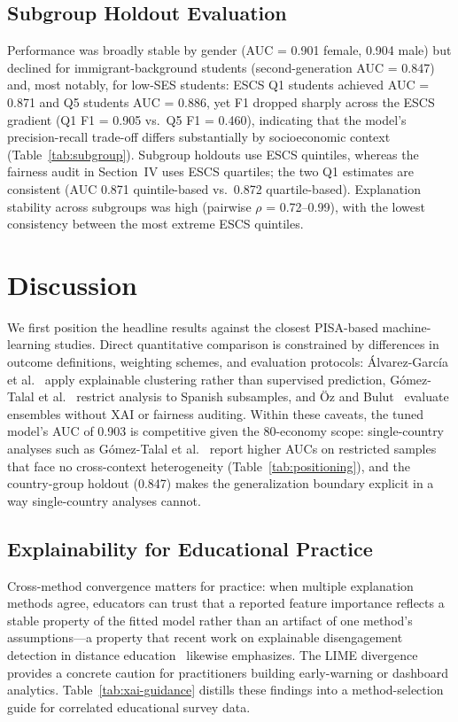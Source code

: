 \documentclass[journal]{IEEEtran}
\begin{document}


\subsection{Subgroup Holdout Evaluation}
Performance was broadly stable by gender (AUC = 0.901 female, 0.904 male) but declined for immigrant-background students (second-generation AUC = 0.847) and, most notably, for low-SES students: ESCS Q1 students achieved AUC = 0.871 and Q5 students AUC = 0.886, yet F1 dropped sharply across the ESCS gradient (Q1 F1 = 0.905 vs.\ Q5 F1 = 0.460), indicating that the model's precision-recall trade-off differs substantially by socioeconomic context (Table~\ref{tab:subgroup}). Subgroup holdouts use ESCS quintiles, whereas the fairness audit in Section~IV uses ESCS quartiles; the two Q1 estimates are consistent (AUC 0.871 quintile-based vs.\ 0.872 quartile-based). Explanation stability across subgroups was high (pairwise $\rho$ = 0.72--0.99), with the lowest consistency between the most extreme ESCS quintiles.



\section{Discussion}
We first position the headline results against the closest PISA-based machine-learning studies. Direct quantitative comparison is constrained by differences in outcome definitions, weighting schemes, and evaluation protocols: \'Alvarez-Garc\'ia et al.~\cite{ce2024profiles} apply explainable clustering rather than supervised prediction, G\'omez-Talal et al.~\cite{Gomez_Talal_2025} restrict analysis to Spanish subsamples, and \"{O}z and Bulut~\cite{Oz_2025_stacking} evaluate ensembles without XAI or fairness auditing. Within these caveats, the tuned model's AUC of 0.903 is competitive given the 80-economy scope: single-country analyses such as G\'omez-Talal et al.~\cite{Gomez_Talal_2025} report higher AUCs on restricted samples that face no cross-context heterogeneity (Table~\ref{tab:positioning}), and the country-group holdout (0.847) makes the generalization boundary explicit in a way single-country analyses cannot.
\subsection{Explainability for Educational Practice}
Cross-method convergence matters for practice: when multiple explanation methods agree, educators can trust that a reported feature importance reflects a stable property of the fitted model rather than an artifact of one method's assumptions---a property that recent work on explainable disengagement detection in distance education~\cite{parsaeifard2026disengagement} likewise emphasizes. The LIME divergence provides a concrete caution for practitioners building early-warning or dashboard analytics. Table~\ref{tab:xai-guidance} distills these findings into a method-selection guide for correlated educational survey data.
\end{document}
